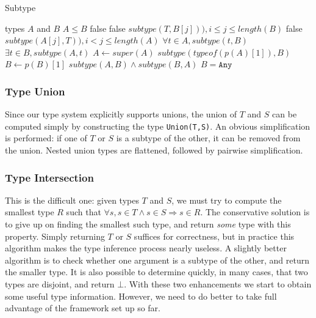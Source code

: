 \documentclass[9pt]{sigplanconf}
\begin{document}
\begin{algorithm}
\caption{Subtype}
\label{alg3}
\begin{algorithmic}
\REQUIRE types $A$ and $B$
\ENSURE $A \leq B$
  \RETURN false
 \ENDIF
    \RETURN false
   \ENDIF
   \RETURN $subtype(T,B[j])), i \leq j \leq length(B)$
   \RETURN false
   \RETURN $subtype(A[j],T)), i < j \leq length(A)$
  \ENDIF
 \ENDFOR
{}
 \RETURN $\forall t \in A, subtype(t,B)$
 \RETURN $\exists t \in B, subtype(A,t)$
\ENDIF
{}
 \ENDIF
 \STATE $A \leftarrow super(A)$
\ENDWHILE
{}
 \RETURN $subtype(typeof(p(A)[1]),B)$
 \STATE $B \leftarrow p(B)[1]$
 \RETURN $subtype(A,B) \land subtype(B,A)$
\ENDIF
\RETURN $B = \texttt{Any}$
\end{algorithmic}
\end{algorithm}


\subsubsection{Type Union}

Since our type system explicitly supports unions, the union of $T$ and
$S$ can be computed simply by constructing the type {\tt Union(T,S)}.
An obvious simplification is performed: if one of $T$ or $S$ is a
subtype of the other, it can be removed from the union. Nested union
types are flattened, followed by pairwise simplification.

\subsubsection{Type Intersection}

This is the difficult one: given types $T$ and $S$, we must try to compute
the smallest type $R$ such that
$\forall s, s \in T \land s \in S \Rightarrow s \in R$.
The conservative solution is to give up on finding the smallest such type, and
return \emph{some} type with this property. Simply returning $T$ or $S$
suffices for correctness, but in practice this algorithm
makes the type inference process nearly useless. A slightly better
algorithm is to check whether one argument is a subtype of the other, and
return the smaller type. It is also possible to determine quickly, in
many cases, that two types are disjoint, and return $\bot$. With these
two enhancements we start to obtain some useful type information. However,
we need to do better to take full advantage of the framework set up
so far.
\end{document}
